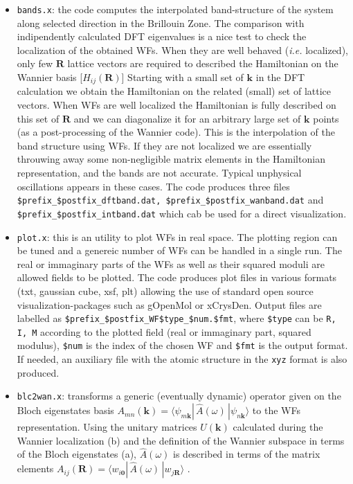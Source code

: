 %
%
\begin{itemize}
%
\item {\tt bands.x}: the code computes the interpolated band-structure
      of the system along selected direction in the Brillouin Zone.
      The comparison with indipendently calculated DFT eigenvalues is
      a nice test to check the localization of the obtained WFs.
      When they are well behaved ({\it i.e.} localized), only few $\mathbf{R}$ lattice 
      vectors are required to described the Hamiltonian on the Wannier basis 
      [$H_{ij}(\mathbf{R})$]
      Starting with a small set of $\mathbf{k}$ in the DFT calculation
      we obtain the Hamiltonian on the related (small) set of lattice vectors. 
      When WFs are well localized 
      the Hamiltonian is fully described on this set of $\mathbf{R}$ and we can
      diagonalize it for an arbitrary large set of $\mathbf{k}$ points 
      (as a post-processing of the Wannier code). This is the
      interpolation of the band structure using WFs. If they are not localized
      we are essentially throuwing away some non-negligible matrix elements 
      in the Hamiltonian representation, and the bands
      are not accurate. Typical unphysical oscillations appears in these cases.
      The code produces three files {\tt \$prefix\_\$postfix\_dftband.dat,
      \$prefix\_\$postfix\_wanband.dat} and {\tt \$prefix\_\$postfix\_intband.dat}
      which cab be used for a direct visualization.

\item {\tt plot.x}: this is an utility to plot WFs in real space.
      The plotting region can be tuned and a genereic number of WFs can be
      handled in a single run.
      The real or immaginary parts of the WFs as well as their squared moduli are
      allowed fields to be plotted.
      The code produces plot files in various formats (txt, gaussian cube, xsf, plt) 
      allowing the use of standard open source visualization-packages
      such as gOpenMol or xCrysDen. Output files are labelled as 
      {\tt \$prefix\_\$postfix\_WF\$type\_\$num.\$fmt}, where {\tt \$type} can be
      {\tt R, I, M} according to the plotted field (real or immaginary part, squared 
      modulus), {\tt \$num} is the index of the chosen WF and {\tt \$fmt} is the
      output format. If needed, an auxiliary file with the atomic structure 
      in the {\tt xyz} format is also produced.
\item {\tt blc2wan.x}: transforms a generic (eventually dynamic) operator 
      given on the Bloch eigenstates basis $A_{mn}(\mathbf{k}) =
      \langle \psi_{m\mathbf{k}} |\, \widehat{A}(\omega) \,| 
      \psi_{n\mathbf{k}} \rangle$ to the WFs representation. 
      Using the unitary matrices $U(\mathbf{k})$ calculated during the Wannier localization
      (b) and the definition of the Wannier subspace in terms of the Bloch eigenstates
      (a), $\widehat{A}(\omega)$ is described in terms of the matrix elements
      $A_{ij}(\mathbf{R}) = \langle w_{i\mathbf{0}} |\, \widehat{A}(\omega) \,| 
      w_{j\mathbf{R}} \rangle$ .
\end{itemize}


